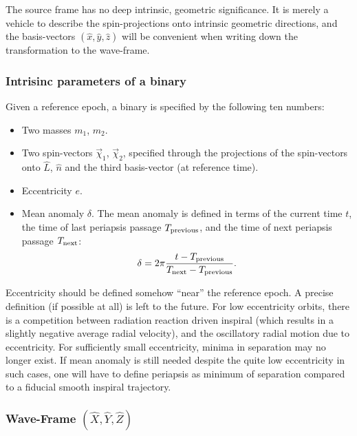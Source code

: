 \documentclass[aps,prd,amssymb,amsmath,amsfonts,superscriptaddress,
floatfix ,preprintnumbers,altaffilletter]{revtex4}
\newcommand{\nNR}{\hat{n}}
\newcommand{\lNR}{\hat L}
\newcommand{\ExS}{{{\hat x}}}
\newcommand{\EyS}{{{\hat y}}}
\newcommand{\EzS}{{{\hat z}}}
\newcommand{\ExW}{\hat X}
\newcommand{\EyW}{\hat Y}
\newcommand{\EzW}{\hat Z}
\newcommand{\meanAnomaly}{\delta} %
\begin{document}
The source frame has no deep intrinsic, geometric significance.  It is
merely a vehicle to describe the spin-projections onto intrinsic
geometric directions, and the basis-vectors $(\ExS, \EyS, \EzS)$ will
be convenient when writing down the transformation to the wave-frame.


\subsubsection{Intrisinc parameters of a binary}

Given a reference epoch, a binary is specified by the following ten
numbers:
\begin{itemize}
\item Two masses $m_1$, $m_2$.
\item Two spin-vectors $\vec\chi_1$, $\vec\chi_2$, specified through 
   the projections of the spin-vectors onto $\lNR$, $\nNR$
  and the third basis-vector (at reference time).
\item Eccentricity $e$.
\item Mean anomaly $\meanAnomaly$.  The mean anomaly is defined in terms of the current time $t$, the time of last periapsis passage $T_{\rm previous}$, and the time of next periapsis passage $T_{\rm next}$: 
\begin{equation}
\meanAnomaly=2\pi\frac{t-T_{\rm previous}}{T_{\rm next}-T_{\rm previous}}.
\end{equation}
\end{itemize}
Eccentricity should be defined somehow ``near'' the reference epoch.
A precise definition (if possible at all) is left to the future.  For
low eccentricity orbits, there is a competition between radiation
reaction driven inspiral (which results in a slightly negative average
radial velocity), and the oscillatory radial motion due to
eccentricity.  For sufficiently small eccentricity, minima in
separation may no longer exist.  If mean anomaly is still needed
despite the quite low eccentricity in such cases, one will have to
define periapsis as minimum of separation compared to a fiducial
smooth inspiral trajectory. 



\subsubsection{Wave-Frame \boldmath$(\ExW, \EyW, \EzW)$}
\label{sec:WaveFrame}
\end{document}
